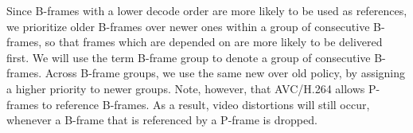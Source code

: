 Since B-frames with a lower decode order are more likely to be used as references, we prioritize older B-frames over newer ones within a group of consecutive B-frames, so that frames which are depended on are more likely to be delivered first. We will use the term B-frame group to denote a group of consecutive B-frames. Across B-frame groups, we use the same new over old policy, by assigning a higher priority to newer groups. Note, however, that AVC/H.264 allows P-frames to reference B-frames. As a result, video distortions will still occur, whenever a B-frame that is referenced by a P-frame is dropped.






